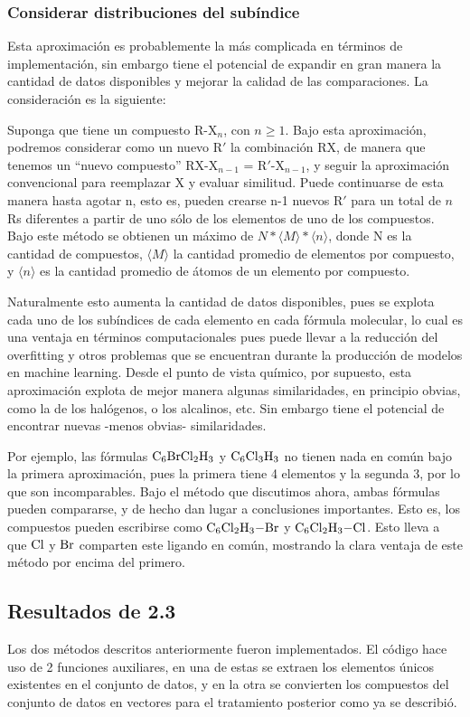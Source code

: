\documentclass[twoside,twocolumn]{article}
\begin{document}
\subsubsection{Considerar distribuciones del sub\'indice}
Esta aproximaci\'on es probablemente la m\'as complicada en t\'erminos de implementaci\'on, sin embargo tiene el potencial de expandir en gran manera la cantidad de datos disponibles y mejorar la calidad de las comparaciones. La consideraci\'on es la siguiente:

Suponga que tiene un compuesto R-X$_n$, con $n \geq 1$. Bajo esta aproximaci\'on, podremos considerar como un nuevo R$'$ la combinaci\'on RX, de manera que tenemos un ``nuevo compuesto'' RX-X$_{n-1}$ = R$'$-X$_{n-1}$, y seguir la aproximaci\'on convencional para reemplazar X y evaluar similitud. Puede continuarse de esta manera hasta agotar n, esto es, pueden crearse n-1 nuevos R$'$ para un total de $n$ Rs diferentes a partir de uno s\'olo de los elementos de uno de los compuestos. Bajo este m\'etodo se obtienen un m\'aximo de $N*\langle M \rangle * \langle n \rangle$, donde N es la cantidad de compuestos, $\langle M \rangle$ la cantidad promedio de elementos por compuesto, y $\langle n \rangle$ es la cantidad promedio de \'atomos de un elemento por compuesto.

Naturalmente esto aumenta la cantidad de datos disponibles, pues se explota cada uno de los sub\'indices de cada elemento en cada f\'ormula molecular, lo cual es una ventaja en t\'erminos computacionales pues puede llevar a la reducci\'on del overfitting y otros problemas que se encuentran durante la producci\'on de modelos en machine learning.
Desde el punto de vista qu\'imico, por supuesto, esta aproximaci\'on explota de mejor manera algunas similaridades, en principio obvias, como la de los hal\'ogenos, o los alcalinos, etc. Sin embargo tiene el potencial de encontrar nuevas -menos obvias- similaridades.

Por ejemplo, las f\'ormulas $\ce{C6BrCl2H3}$ y $\ce{C6Cl3H3}$ no tienen nada en com\'un bajo la primera aproximaci\'on, pues la primera tiene 4 elementos y la segunda 3, por lo que son incomparables.
Bajo el m\'etodo que discutimos ahora, ambas f\'ormulas pueden compararse, y de hecho dan lugar a conclusiones importantes. Esto es, los compuestos pueden escribirse como $\ce{C6Cl2H3-Br}$ y $\ce{C6Cl2H3-Cl}$. Esto lleva a que $\ce{Cl}$ y $\ce{Br}$ comparten este ligando en com\'un, mostrando la clara ventaja de este m\'etodo por encima del primero.

\subsection{Resultados de 2.3}
Los dos m\'etodos descritos anteriormente fueron implementados. El c\'odigo hace uso de 2 funciones auxiliares, en una de estas se extraen los elementos \'unicos existentes en el conjunto de datos, y en la otra se convierten los compuestos del conjunto de datos en vectores para el tratamiento posterior como ya se describi\'o.
\end{document}
